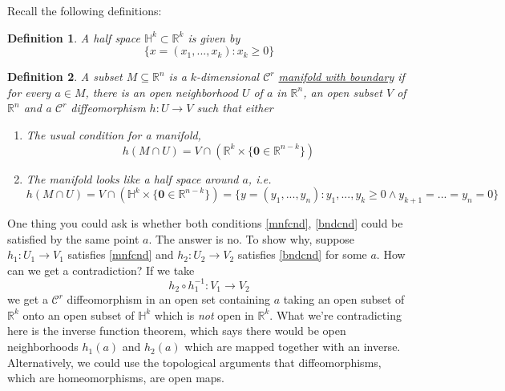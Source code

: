 \documentclass{article}
\newtheorem{definition}{Definition}
\newcommand{\reals}[0]{\mathbb{R}}
\newcommand{\mc}[1]{\mathcal{#1}}
\newcommand{\mb}[1]{\mathbf{#1}}
\newcommand{\hlfspc}[0]{\mathbb{H}}
\begin{document}
Recall the following definitions:
\begin{definition}
  A half space \(\hlfspc^k \subset \reals^k\) is given by
  \begin{equation}\{x = (x_1,...,x_k) : x_k \geq 0\}\end{equation}
\end{definition}
\begin{definition}
  A subset \(M \subseteq \reals^n\) is a \(k\)-dimensional \(\mc{C}^r\) \underline{manifold with boundary} if for every \(a \in M\), there is an open neighborhood \(U\) of \(a\) in \(\reals^n\), an open subset \(V\) of \(\reals^n\) and a \(\mc{C}^r\) diffeomorphism \(h: U \to V\) such that either
  \begin{enumerate}[label=(\arabic*)]

    \item The usual condition for a manifold,
    \begin{equation}h(M \cap U) = V \cap (\reals^k \times \{\mb{0} \in \reals^{n - k}\})\end{equation}
    \label{mnfcnd}

    \item The manifold looks like a half space around \(a\), i.e.
    \begin{equation}h(M \cap U) = V \cap (\hlfspc^k \times \{\mb{0} \in \reals^{n - k}\}) = \{y = (y_1,...,y_n) : y_1,...,y_k \geq 0 \land y_{k + 1} = ... = y_n = 0\}\end{equation} \label{bndcnd}

  \end{enumerate}
  \label{mwb}
\end{definition}
One thing you could ask is whether both conditions \ref{mnfcnd}, \ref{bndcnd} could be satisfied by the same point \(a\). The answer is no. To show why, suppose \(h_1: U_1 \to V_1\) satisfies \ref{mnfcnd} and \(h_2: U_2 \to V_2\) satisfies \ref{bndcnd} for some \(a\). How can we get a contradiction? If we take
\begin{equation}h_2 \circ h_1^{-1}: V_1 \to V_2\end{equation}
we get a \(\mc{C}^r\) diffeomorphism in an open set containing \(a\) taking an open subset of \(\reals^k\) onto an open subset of \(\hlfspc^k\) which is \textit{not} open in \(\reals^k\). What we're contradicting here is the inverse function theorem, which says there would be open neighborhoods \(h_1(a)\) and \(h_2(a)\) which are mapped together with an inverse. Alternatively, we could use the topological arguments that diffeomorphisms, which are homeomorphisms, are open maps.
\end{document}
